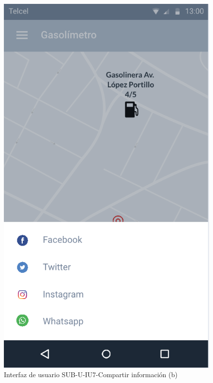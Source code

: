 \begin{figure}[H]
	\centering
	\includegraphics[scale=.55]{Capitulo4/software/submodulos/usuarios/images/sub-u-iu7_b}
	\caption{Interfaz de usuario SUB-U-IU7-Compartir información (b)}
	\label{fig:sub-u-iu7.b}
\end{figure}